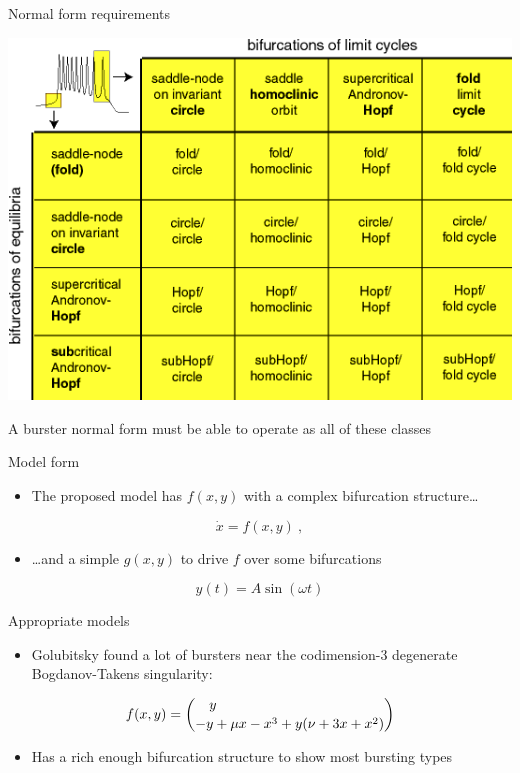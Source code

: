\documentclass[presentation]{beamer}
\begin{document}
\begin{frame}[label={sec:orge456741}]{Normal form requirements}
\begin{center}
\includegraphics[height=.75\textheight]{./categories.png}
\end{center}

A burster normal form must be able to operate as all of these classes
\end{frame}

\begin{frame}[label={sec:orgbaf51c4}]{Model form}
\begin{itemize}
\item The proposed model has \(f(x,y)\) with a complex bifurcation structure\ldots{}
\end{itemize}

\[\dot{x} = f(x,y)~,\]

\begin{itemize}
\item \ldots{}and a simple \(g(x,y)\) to drive \(f\) over some bifurcations
\end{itemize}

\[y(t) = A\sin(\omega t)\]
\end{frame}

\begin{frame}[label={sec:org2a573bc}]{Appropriate models}
\begin{itemize}
\item Golubitsky found a lot of bursters near the codimension-3 degenerate Bogdanov-Takens singularity:
\end{itemize}

\[f(x,y) = \binom{\quad y\hfill}{-y + \mu x - x^3 + y(\nu + 3x + x^2)}\]

\begin{itemize}
\item Has a rich enough bifurcation structure to show most bursting types
\end{itemize}
\end{frame}
\end{document}
